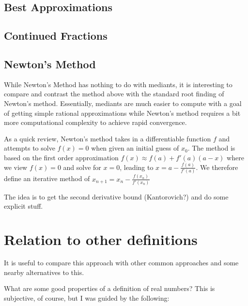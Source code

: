 \documentclass[12pt]{article}
\theoremstyle{remark}
\begin{document}
\subsection{Best Approximations}

\subsection{Continued Fractions}


\subsection{Newton's Method}

While Newton's Method has nothing to do with mediants, it is interesting to compare and contrast the method above with the standard root finding of Newton's method. Essentially, mediants are much easier to compute with a goal of getting simple rational approximations while Newton's method requires a bit more computational complexity to achieve rapid convergence. 

As a quick review, Newton's method takes in a differentiable function $f$ and attempts to solve $f(x)= 0$ when given an initial guess of $x_0$. The method is based on the first order approximation $f(x) \approx f(a) + f'(a) (a-x) $ where we view $f(x) =0$ and solve for $x =0$, leading to $x = a - \tfrac{f(a)}{f'(a)}$. We therefore define an iterative method of $x_{n+1} = x_n - \tfrac{f(x_n)}{f'(x_n)}$



The idea is to get the second derivative bound (Kantorovich?) and do some explicit stuff. 


\section{Relation to other definitions}

It is useful to compare this approach with other common approaches and some nearby alternatives to this. 

What are some good properties of a definition of real numbers? This is subjective, of course, but I was guided by the following: 
\end{document}
